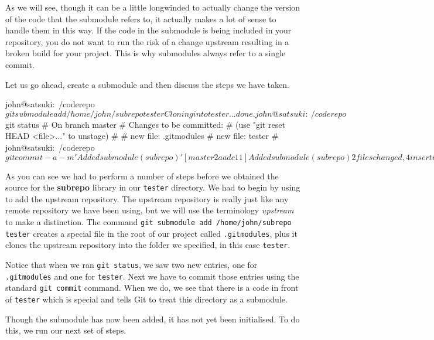 As we will see, though it can be a little longwinded to actually change the version of the code that the submodule refers to,
it actually makes a lot of sense to handle them in this way.
If the code in the submodule is being included in your repository, you do not want to run the risk of a change upstream resulting in a broken build for your project.
This is why submodules always refer to a single commit.

Let us go ahead, create a submodule and then discuss the steps we have taken.

\begin{code}
john@satsuki:~/coderepo$ git submodule add /home/john/subrepo tester
Cloning into tester...
done.
john@satsuki:~/coderepo$ git status
# On branch master
# Changes to be committed:
#   (use "git reset HEAD <file>..." to unstage)
#
#	new file:   .gitmodules
#	new file:   tester
#
john@satsuki:~/coderepo$ git commit -a -m 'Added submodule (subrepo)'
[master 2aadc11] Added submodule (subrepo)
 2 files changed, 4 insertions(+), 0 deletions(-)
 create mode 100644 .gitmodules
 create mode 160000 tester
john@satsuki:~/coderepo/tester$ 
\end{code}

As you can see we had to perform a number of steps before we obtained the source for the \textbf{subrepo} library in our \texttt{tester} directory.
We had to begin by using  to add the upstream repository.
The upstream repository is really just like any remote repository we have been using, but we will use the terminology \emph{upstream} to make a distinction.
The command \texttt{git submodule add /home/john/subrepo tester} creates a special file in the root of our project called \texttt{.gitmodules},
plus it clones the upstream repository into the folder we specified, in this case \texttt{tester}.

Notice that when we ran \texttt{git status}, we saw two new entries, one for \texttt{.gitmodules} and one for \texttt{tester}.
Next we have to commit those entries using the standard \texttt{git commit} command.
When we do, we see that there is a code in front of \texttt{tester} which is special and tells Git to treat this directory as a submodule.

Though the submodule has now been added, it has not yet been initialised.
To do this, we run our next set of steps.


